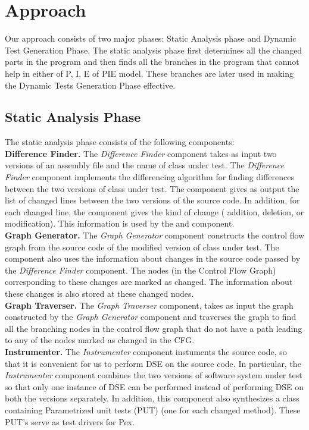 \section{Approach}
Our approach consists of two major phases: Static Analysis phase and Dynamic Test Generation Phase.
The static analysis phase first determines all the changed parts in the program and then finds all the branches in the program that cannot help in either of  
P, I, E of PIE model. These branches are later used in making the Dynamic Tests Generation Phase effective.
\subsection{Static Analysis Phase}
The static analysis phase consists of the following components:
\\ \textbf{Difference Finder.} The \emph{Difference Finder} component takes as input two versions of an assembly 
	file and the name of class under test. The \emph{Difference Finder} component implements the differencing 
	algorithm for finding differences between the two versions of class under test. 
	The component gives as output the list of changed lines between the two versions of the source code. 
	In addition, for each changed line, the component gives the kind of change ( addition, deletion, or modification). 
	This information is used by the  and  component.
	\\ \textbf{Graph Generator.} The \emph{Graph Generator} component constructs the control flow graph from the source code of the modified version of class under test. The component also uses the information about changes in the source code passed by the \emph{Difference Finder} component. The nodes (in the Control Flow Graph) corresponding to these changes are marked as changed. The information about these changes is also stored at these changed nodes.
	\\ \textbf{Graph Traverser.} The \emph{Graph Traverser} component, takes as input the graph constructed by the \emph{Graph Generator} component and traverses the graph to find all the branching nodes in the control flow graph that do not have a path leading to any of the nodes marked as changed in the CFG.    
	\\ \textbf{Instrumenter.} The \emph{Instrumenter} component instuments the source code, so that it is convenient for us to perform DSE on the source code. In particular, the \emph{Instrumenter} component combines the two versions of software system under test so that only one instance of DSE can be performed instead of performing DSE on both the versions separately. In addition, this component also synthesizes a class containing Parametrized unit tests (PUT) (one for each changed method). These  PUT's serve as test drivers for Pex. 
	

